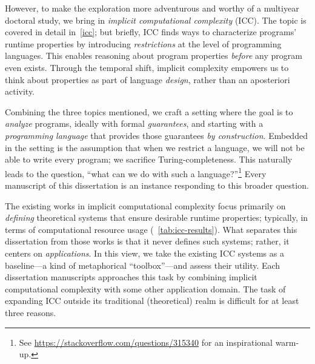 However, to make the exploration more adventurous and worthy of a multiyear doctoral study, we bring in \emph{implicit computational complexity} (ICC).
The topic is covered in detail in~\autoref{icc};
but briefly, ICC finds ways to characterize programs' runtime properties by introducing \emph{restrictions} at the level of programming languages.
This enables reasoning about program properties \emph{before} any program even exists.
Through the temporal shift, implicit complexity empowers us to think about properties as part of language \emph{design}, rather than an aposteriori activity.

Combining the three topics mentioned, we craft a setting where the goal is to \emph{analyze} programs, ideally with formal \emph{guarantees}, and starting with a \emph{programming language} that provides those guarantees \emph{by construction}.
Embedded in the setting is the assumption that when we restrict a language, we will not be able to write every program;
\ie we sacrifice Turing-completeness.
This naturally leads to the question, \enquote{what can we do with such a language?}\footnote{
See \url{https://stackoverflow.com/questions/315340} for an inspirational warm-up.}
Every manuscript of this dissertation is an instance responding to this broader question.

The existing works in implicit computational complexity focus primarily on \emph{defining} theoretical systems that ensure desirable runtime properties;
typically, in terms of computational resource usage (\cf~\autoref{tab:icc-results}).
What separates this dissertation from those works is that it never defines such systems;
rather, it centers on \emph{applications}.
In this view, we take the existing ICC systems as a baseline---a kind of metaphorical \enquote{toolbox}---and assess their utility.
Each dissertation manuscripts approaches this task by combining implicit computational complexity with some other application domain.
The task of expanding ICC outside its traditional (theoretical) realm is difficult for at least three reasons.

